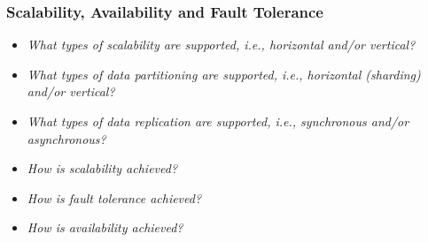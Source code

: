 
\begin{frame}
\frametitle{Scalability, Availability and Fault Tolerance}
\begin{itemize}
\item \emph{What types of scalability are supported, i.e., horizontal and/or vertical?}
\item \emph{What types of data partitioning are supported, i.e., horizontal (sharding) and/or vertical?}
\item \emph{What types of data replication are supported, i.e., synchronous and/or asynchronous?}
\item \emph{How is scalability achieved?}
\item \emph{How is fault tolerance achieved?}
\item \emph{How is availability achieved?}
\end{itemize}
\end{frame} 